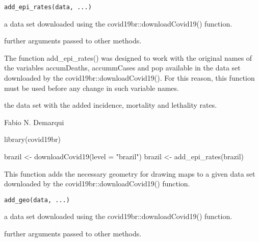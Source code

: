 \documentclass[letterpaper]{book}
\begin{document}
%
\begin{Usage}
\begin{verbatim}
add_epi_rates(data, ...)
\end{verbatim}
\end{Usage}
%
\begin{Arguments}
\begin{ldescription}
\item[\code{data}] a data set downloaded using the covid19br::downloadCovid19() function.

\item[\code{...}] further arguments passed to other methods.
\end{ldescription}
\end{Arguments}
%
\begin{Details}\relax
The function add\_epi\_rates() was designed to work with the original names of the variables accumDeaths, accummCases and pop available in the data set downloaded by the covid19br::downloadCovid19(). For this reason, this function must be used before any change in such variable names.
\end{Details}
%
\begin{Value}
the data set with the added incidence, mortality and lethality rates.
\end{Value}
%
\begin{Author}\relax
Fabio N. Demarqui 
\end{Author}
%
\begin{Examples}
\begin{ExampleCode}

library(covid19br)

brazil <- downloadCovid19(level = "brazil")
brazil <- add_epi_rates(brazil)


\end{ExampleCode}
\end{Examples}
%
\begin{Description}\relax
This function adds the necessary geometry for drawing maps to a given data set downloaded by the covid19br::downloadCovid19() function.
\end{Description}
%
\begin{Usage}
\begin{verbatim}
add_geo(data, ...)
\end{verbatim}
\end{Usage}
%
\begin{Arguments}
\begin{ldescription}
\item[\code{data}] a data set downloaded using the covid19br::downloadCovid19() function.

\item[\code{...}] further arguments passed to other methods.
\end{ldescription}
\end{Arguments}
\end{document}
